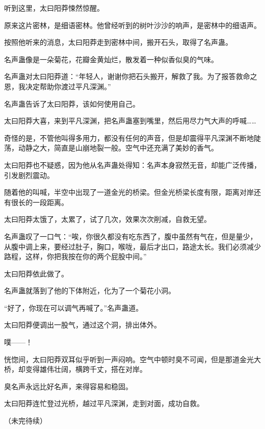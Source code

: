 \begin{this_body}
听到这里，太曰阳莽悚然惊醒。

原来这片密林，是细语密林。他曾经听到的树叶沙沙的响声，是密林中的细语声。

按照他听来的消息，太曰阳莽走到密林中间，搬开石头，取得了名声蛊。

名声蛊像是一朵菊花，花瓣金黄灿烂，散发着一种似香似臭的气味。

名声蛊对太曰阳莽道：“年轻人，谢谢你把石头搬开，解救了我。为了报答救命之恩，我决定帮助你渡过平凡深渊。”

名声蛊告诉了太曰阳莽，该如何使用自己。

太曰阳莽大喜，来到平凡深渊，把名声蛊塞到嘴里，然后用尽力气大声的呼喊……

奇怪的是，不管他叫得多用力，都没有任何的声音，但是却震得平凡深渊不断地陡荡，动静之大，简直是山崩地裂一般。空气中还充满了美妙的香气。

太曰阳莽也不疑惑，因为他从名声蛊处得知：名声本身寂然无音，却能广泛传播，引发剧烈震动。

随着他的叫喊，半空中出现了一道金光的桥梁。但金光桥梁长度有限，距离对岸还有很长的一段距离。

太曰阳莽太饿了，太累了，试了几次，效果次次削减，自救无望。

名声蛊叹了一口气：“唉，你很久都没有吃东西了，腹中虽然有气在，但是量少，从腹中调上来，要经过肚子，胸口，喉咙，最后才出口，路途太长。我们必须减少路程，这样，你把我按在你的两个屁股中间。”

太曰阳莽依此做了。

名声蛊就落到了他的下体附近，化为了一个菊花小洞。

“好了，你现在可以调气再喊了。”名声蛊道。

太曰阳莽便调出一股气，通过这个洞，排出体外。

噗——！

恍惚间，太曰阳莽双耳似乎听到一声闷响。空气中顿时臭不可闻，但是那道金光大桥，却变得雄伟壮阔，横跨千丈，搭在对岸。

臭名声永远比好名声，来得容易和稳固。

太曰阳莽连忙登过光桥，越过平凡深渊，走到对面，成功自救。

（未完待续）

\end{this_body}

